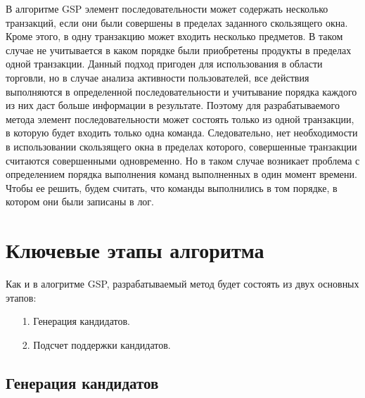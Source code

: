 В алгоритме GSP элемент последовательности может содержать несколько транзакций, если они были совершены в пределах заданного скользящего окна. Кроме этого, в одну транзакцию может входить несколько предметов. В таком случае не учитывается в каком порядке были приобретены продукты в пределах одной транзакции. Данный подход пригоден для использования в области торговли, но в случае анализа активности пользователей,
все действия выполняются в определенной последовательности и
учитывание порядка каждого из них даст больше информации в результате.
Поэтому для разрабатываемого метода элемент последовательности может состоять только из одной транзакции, в которую будет входить только одна команда. Следовательно, нет необходимости в использовании скользящего окна в пределах которого, совершенные транзакции считаются совершенными одновременно. Но в таком случае возникает проблема с определением порядка выполнения команд выполненных в один момент времени. Чтобы ее решить, будем считать, что команды выполнились в том порядке, в котором они были записаны в лог.


\section{Ключевые этапы алгоритма}
Как и в алогритме GSP, разрабатываемый метод будет состоять из двух основных этапов:

\begin{enumerate}
	\item[1.] Генерация кандидатов.
	\item[2.] Подсчет поддержки кандидатов.
\end{enumerate}


\subsection{Генерация кандидатов}

